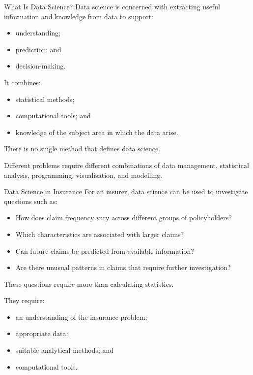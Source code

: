 \documentclass[
  ignorenonframetext,
  aspectratio=169,
]{beamer}
\providecommand{\tightlist}{%
  \setlength{\itemsep}{0pt}\setlength{\parskip}{0pt}}
\begin{document}
\begin{frame}{What Is Data Science?}
\protect{}\label{what-is-data-science}
Data science is concerned with extracting useful information and
knowledge from data to support:

\begin{itemize}
\tightlist
\item
  understanding;
\item
  prediction; and
\item
  decision-making.
\end{itemize}

It combines:

\begin{itemize}
\tightlist
\item
  statistical methods;
\item
  computational tools; and
\item
  knowledge of the subject area in which the data arise.
\end{itemize}

There is no single method that defines data science.

Different problems require different combinations of data management,
statistical analysis, programming, visualisation, and modelling.
\end{frame}

\begin{frame}{Data Science in Insurance}
\protect{}\label{data-science-in-insurance}
For an insurer, data science can be used to investigate questions such
as:

\begin{itemize}
\tightlist
\item
  How does claim frequency vary across different groups of
  policyholders?
\item
  Which characteristics are associated with larger claims?
\item
  Can future claims be predicted from available information?
\item
  Are there unusual patterns in claims that require further
  investigation?
\end{itemize}

These questions require more than calculating statistics.

They require:

\begin{itemize}
\tightlist
\item
  an understanding of the insurance problem;
\item
  appropriate data;
\item
  suitable analytical methods; and
\item
  computational tools.
\end{itemize}
\end{frame}
\end{document}
